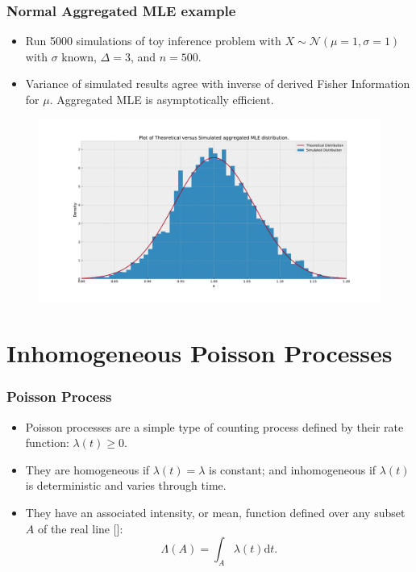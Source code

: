\documentclass[11pt]{beamer}
\begin{document}
\begin{frame}
	\frametitle{Normal Aggregated MLE example}
	\begin{itemize}
		\item Run 5000 simulations of toy inference problem with $X \sim \mathcal{N}(\mu=1, \sigma=1)$ with $\sigma$ known, $\Delta=3$, and $n=500$.
		\item Variance of simulated results agree with inverse of derived Fisher Information for $\mu$. Aggregated MLE is asymptotically efficient.
	\end{itemize}
	\begin{figure}[!h]
		\includegraphics[height=6cm, width=12cm]{mle_distribution.pdf}
	\end{figure}
\end{frame}

\section{Inhomogeneous Poisson Processes}

\begin{frame}
	\frametitle{Poisson Process}
	\begin{itemize}
		\item Poisson processes are a simple type of counting process defined by their rate function: $\lambda(t) \geq 0$.
		\item They are homogeneous if $\lambda(t) = \lambda$ is constant; and inhomogeneous if $\lambda(t)$ is deterministic and varies through time.
		\item They have an associated intensity, or mean, function defined over any subset $A$ of the real line [\cite{daley_point_processes}]:
		\begin{equation*}
			\Lambda(A) = \int_A \lambda(t) \text{d}t.
		\end{equation*}
	\end{itemize}
\end{frame}
\end{document}
